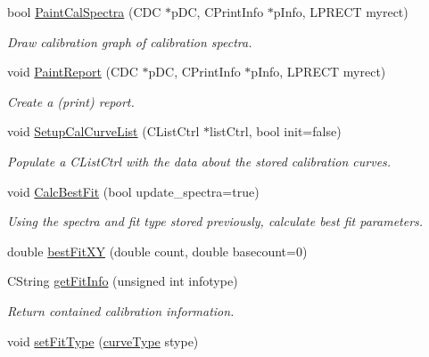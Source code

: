 \begin{DoxyCompactItemize}
bool \hyperlink{classCCalibrationCurve_a364813fa675050d610a05f1bb5b459c6}{PaintCalSpectra} (CDC $\ast$pDC, CPrintInfo $\ast$pInfo, LPRECT myrect)
\begin{DoxyCompactList}\small\item\em Draw calibration graph of calibration spectra. \item\end{DoxyCompactList}\item 
void \hyperlink{classCCalibrationCurve_a80c55b25c20f4f2e24d180fedb1fa9f2}{PaintReport} (CDC $\ast$pDC, CPrintInfo $\ast$pInfo, LPRECT myrect)
\begin{DoxyCompactList}\small\item\em Create a (print) report. \item\end{DoxyCompactList}\item 
void \hyperlink{classCCalibrationCurve_a63c6f064aa08f3daa9f227958a5c6164}{SetupCalCurveList} (CListCtrl $\ast$listCtrl, bool init=false)
\begin{DoxyCompactList}\small\item\em Populate a CListCtrl with the data about the stored calibration curves. \item\end{DoxyCompactList}\item 
void \hyperlink{classCCalibrationCurve_a5554aab100774cb2358e6a3eb40de523}{CalcBestFit} (bool update\_\-spectra=true)
\begin{DoxyCompactList}\small\item\em Using the spectra and fit type stored previously, calculate best fit parameters. \item\end{DoxyCompactList}\item 
double \hyperlink{classCCalibrationCurve_a8d3be4b7f143bde1d89ccd9845ece01b}{bestFitXY} (double count, double basecount=0)
\item 
CString \hyperlink{classCCalibrationCurve_a8d88120889a7d37df6680d268d80a473}{getFitInfo} (unsigned int infotype)
\begin{DoxyCompactList}\small\item\em Return contained calibration information. \item\end{DoxyCompactList}\item 
void \hyperlink{classCCalibrationCurve_a490fb5f1ce72ba3a7650bdbbd97bb0b5}{setFitType} (\hyperlink{classCCalibrationCurve_ab9d3dc7e1f672a8bd6b7705f94798b7a}{curveType} stype)

\end{DoxyCompactItemize}
